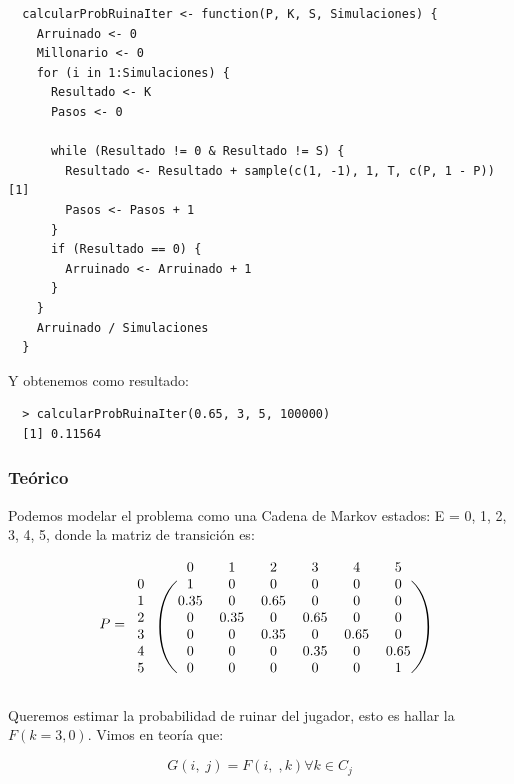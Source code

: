 \documentclass[11pt]{article}
\begin{document}
\begin{verbatim}
  calcularProbRuinaIter <- function(P, K, S, Simulaciones) {
    Arruinado <- 0
    Millonario <- 0
    for (i in 1:Simulaciones) {
      Resultado <- K
      Pasos <- 0

      while (Resultado != 0 & Resultado != S) {
        Resultado <- Resultado + sample(c(1, -1), 1, T, c(P, 1 - P))[1]
        Pasos <- Pasos + 1
      }
      if (Resultado == 0) {
        Arruinado <- Arruinado + 1
      }
    }
    Arruinado / Simulaciones
  }
\end{verbatim}

Y obtenemos como resultado:

\begin{verbatim}
  > calcularProbRuinaIter(0.65, 3, 5, 100000)
  [1] 0.11564
\end{verbatim}

\subsubsection*{Teórico}

Podemos modelar el problema como una Cadena de Markov estados: E = {0, 1, 2, 3, 4, 5},
donde la matriz de transición es:

\begin{equation*}
  P = 
  \begin{blockarray}{cccccccc}
     & & 0 & 1 & 2 & 3 & 4 & 5 \\
    \begin{block}{cc(cccccc)}
      0 & & 1    & 0    & 0    & 0    & 0    & 0 \\
      1 & & 0.35 & 0    & 0.65 & 0    & 0    & 0 \\
      2 & & 0    & 0.35 & 0    & 0.65 & 0    & 0 \\
      3 & & 0    & 0    & 0.35 & 0    & 0.65 & 0 \\
      4 & & 0    & 0    & 0    & 0.35 & 0    & 0.65 \\
      5 & & 0    & 0    & 0    & 0    & 0    & 1 \\
    \end{block}
  \end{blockarray}
\end{equation*}

Queremos estimar la probabilidad de ruinar del jugador, esto es hallar la $ F(k = 3, 0) $. 
Vimos en teoría que:

\begin{equation*}
  G(i, \; j) = F(i, \;, k) \forall k \in C_j
\end{equation*}
\end{document}
